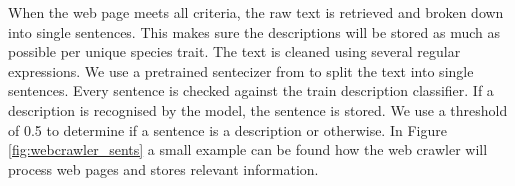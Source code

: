 \documentclass[a4paper, 12pt, oneside]{book} %
\begin{document}
When the web page meets all criteria, the raw text is retrieved and broken down into single sentences. 
This makes sure the descriptions will be stored as much as possible per unique species trait.
The text is cleaned using several regular expressions. %
We use a pretrained sentecizer from \textcite{wolf_huggingfaces_2020} to split the text into single sentences.
Every sentence is checked against the train description classifier.
If a description is recognised by the model, the sentence is stored.
We use a threshold of 0.5 to determine if a sentence is a description or otherwise.
In Figure \ref{fig:webcrawler_sents} a small example can be found how the web crawler will process web pages and stores relevant information. 

\end{document}
